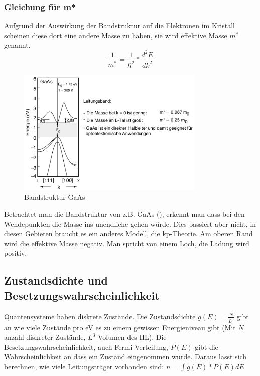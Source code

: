 \documentclass{article}
\begin{document}
    \subsubsection{Gleichung für m*}
    Aufgrund der Auswirkung der Bandstruktur auf die Elektronen im Kristall scheinen diese dort eine andere Masse zu haben, sie wird
    effektive Masse $m^{*}$ genannt.
    \begin{equation}
        \frac{1}{m^{*}} = \frac{1}{\hbar^2}*\frac{d^2E}{dk^2}
    \end{equation}
    \begin{figure}
        \centering
        \includegraphics[width=0.8\textwidth]{fig/bandstrukturGaAs}
        \caption{Bandstruktur GaAs}
        \label{fig:bandGaAs}
    \end{figure}
    Betrachtet man die Bandstruktur von z.B. GaAs (), erkennt man dass bei den Wendepunkten die Masse ins unendliche
    gehen w\"urde. Dies passiert aber nicht, in diesen Gebieten braucht es ein anderes Modell, die kp-Theorie.
    Am oberen Rand wird die effektive Masse negativ. Man spricht von einem Loch, die Ladung wird positiv.

\subsection{Zustandsdichte und Besetzungswahrscheinlichkeit }\label{k4:zustandsDichte}
    Quantensysteme haben diskrete Zust\"ande.
    Die Zustandsdichte $g(E) = \frac{N}{L^3}$ gibt an wie viele Zust\"ande pro eV es zu einem gewissen Energieniveau gibt (Mit $N$ anzahl diskreter Zust\"ande, $L^3$ Volumen des HL).
    Die Besetzungswahrscheinlichkeit, auch Fermi-Verteilung, $P(E)$ gibt die Wahrscheinlichkeit an dass ein Zustand eingenommen wurde.
    Daraus l\"asst sich berechnen, wie viele Leitungstr\"ager vorhanden sind: $n = \int{g(E)*P(E) dE}$
    
\end{document}
